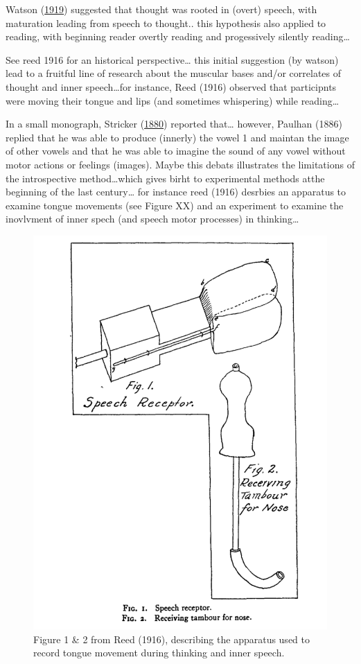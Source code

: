 \documentclass[a4paper,12pt,twoside,openright,oldfontcommands]{memoir}
\begin{document}
Watson (\protect\hyperlink{ref-watson_psychology_1919}{1919}) suggested that thought was rooted in (overt) speech, with maturation leading from speech to thought.. this hypothesis also applied to reading, with beginning reader overtly reading and progessively silently reading\ldots{}

See reed 1916 for an historical perspective\ldots{} this initial suggestion (by watson) lead to a fruitful line of research about the muscular bases and/or correlates of thought and inner speech\ldots for instance, Reed (1916) observed that participnts were moving their tongue and lips (and sometimes whispering) while reading\ldots{}

In a small monograph, Stricker (\protect\hyperlink{ref-stricker_studien_1880}{1880}) reported that\ldots{} however, Paulhan (1886) replied that he was able to produce (innerly) the vowel 1 and maintan the image of other vowels and that he was able to imagine the sound of any vowel without motor actions or feelings (images). Maybe this debats illustrates the limitations of the introspective method\ldots which gives birht to experimental methods atthe beginning of the last century\ldots{} for instance reed (1916) desrbies an apparatus to examine tongue movements (see Figure XX) and an experiment to examine the inovlvment of inner spech (and speech motor processes) in thinking\ldots{}

\begin{figure}

{\centering \includegraphics[width=0.5\linewidth]{assets/reed} 

}

\caption{Figure 1 \& 2 from Reed (1916), describing the apparatus used to record tongue movement during thinking and inner speech.}\label{fig:reed}
\end{figure}
\end{document}
